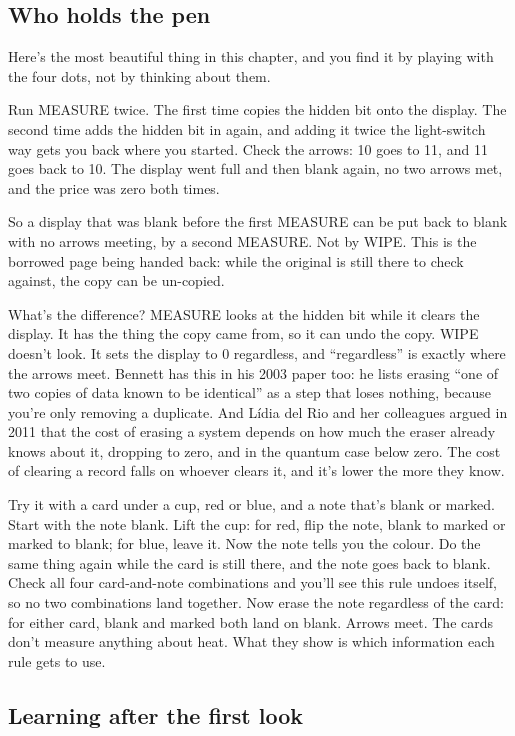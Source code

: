 \documentclass[11pt,twoside]{article}
\theoremstyle{thielethm}
\theoremstyle{thieledef}
\theoremstyle{thieledef}
\theoremstyle{thieledef}
\theoremstyle{thielethm}
\theoremstyle{thieleobs}
\theoremstyle{thielethm}
\begin{document}
\subsection{Who holds the pen}

Here's the most beautiful thing in this chapter, and you find it by playing with the four dots, not by thinking about them.

Run MEASURE twice. The first time copies the hidden bit onto the display. The second time adds the hidden bit in again, and adding it twice the light-switch way gets you back where you started. Check the arrows: 10 goes to 11, and 11 goes back to 10. The display went full and then blank again, no two arrows met, and the price was zero both times.

So a display that was blank before the first MEASURE can be put back to blank with no arrows meeting, by a second MEASURE. Not by WIPE. This is the borrowed page being handed back: while the original is still there to check against, the copy can be un-copied.

What's the difference? MEASURE looks at the hidden bit while it clears the display. It has the thing the copy came from, so it can undo the copy. WIPE doesn't look. It sets the display to 0 regardless, and ``regardless'' is exactly where the arrows meet. Bennett has this in his 2003 paper too: he lists erasing ``one of two copies of data known to be identical'' as a step that loses nothing, because you're only removing a duplicate. And Lídia del Rio and her colleagues argued in 2011 that the cost of erasing a system depends on how much the eraser already knows about it, dropping to zero, and in the quantum case below zero. The cost of clearing a record falls on whoever clears it, and it's lower the more they know.

Try it with a card under a cup, red or blue, and a note that's blank or marked. Start with the note blank. Lift the cup: for red, flip the note, blank to marked or marked to blank; for blue, leave it. Now the note tells you the colour. Do the same thing again while the card is still there, and the note goes back to blank. Check all four card-and-note combinations and you'll see this rule undoes itself, so no two combinations land together. Now erase the note regardless of the card: for either card, blank and marked both land on blank. Arrows meet. The cards don't measure anything about heat. What they show is which information each rule gets to use.

\subsection{Learning after the first look}
\end{document}
